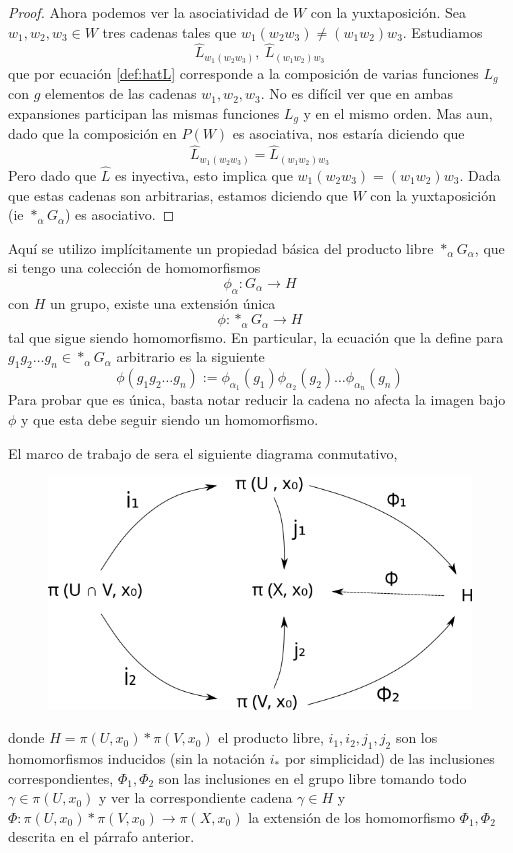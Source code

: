 \begin{proof}
  Ahora podemos ver la asociatividad de \(W\) con la yuxtaposición. Sea
  \(w_1, w_2, w_3 \in W\) tres cadenas tales que \(w_1 (w_2 w_3) \neq
  (w_1 w_2) w_3\). Estudiamos \[\hat L_{w_1 (w_2 w_3)},\ \hat L_{(w_1
    w_2) w_3}\] que por ecuación \eqref{def:hatL} corresponde a la
  composición de varias funciones \(L_g\) con \(g\) elementos de las
  cadenas \(w_1, w_2, w_3\).  No es difícil ver que en ambas expansiones
  participan las mismas funciones \(L_g\) y en el mismo orden. Mas aun,
  dado que la composición en \(P(W)\) es asociativa, nos estaría diciendo
  que
  \[ \hat L_{w_1 (w_2 w_3)} = \hat L_{(w_1 w_2) w_3}\]
  Pero dado que \(\hat L\) es inyectiva, esto implica que \(w_1 (w_2
  w_3) = (w_1 w_2) w_3\). Dada que estas cadenas son arbitrarias,
  estamos diciendo que \(W\) con la yuxtaposición (ie \(*_\alpha
  G_\alpha\)) es asociativo.
\end{proof}

Aquí se utilizo implícitamente un propiedad básica del producto libre
\(*_\alpha G_\alpha\), que si tengo una colección de homomorfismos
\[ \phi_\alpha : G_\alpha \to H \]
con \(H\) un grupo, existe una extensión única
\[ \phi : *_\alpha G_\alpha \to H \]
tal que sigue siendo homomorfismo. En particular, la ecuación que la
define para \(g_1 g_2 \dots g_n \in *_\alpha G_\alpha\) arbitrario es la siguiente
\[
  \phi \left( g_1 g_2 \dots g_n \right) := \phi_{\alpha_1} (g_1)
  \phi_{\alpha_2} (g_2) \dots \phi_{\alpha_n} (g_n)
\]
Para probar que es única, basta notar reducir la cadena no afecta la
imagen bajo \(\phi\) y que esta debe seguir siendo un homomorfismo.

El marco de trabajo de \vank sera el siguiente diagrama conmutativo,
\begin{figure}[h]
  \centering
  \includegraphics[scale=0.5]{./imagenes/van.png}
\end{figure}
donde \( H = \pi (U, x_0) * \pi (V, x_0)\) el producto libre, \(i_1,
i_2, j_1, j_2\) son los homomorfismos inducidos (sin la notación \(i_*\)
por simplicidad) de las inclusiones correspondientes, \(\Phi_1, \Phi_2\)
son las inclusiones en el grupo libre tomando todo \(\gamma \in \pi (U,
x_0)\) y ver la correspondiente cadena \(\gamma \in H\) y \(\Phi :
\pi(U, x_0) * \pi (V, x_0) \to \pi (X, x_0)\) la extensión de los
homomorfismo \(\Phi_1, \Phi_2\) descrita en el párrafo anterior.

